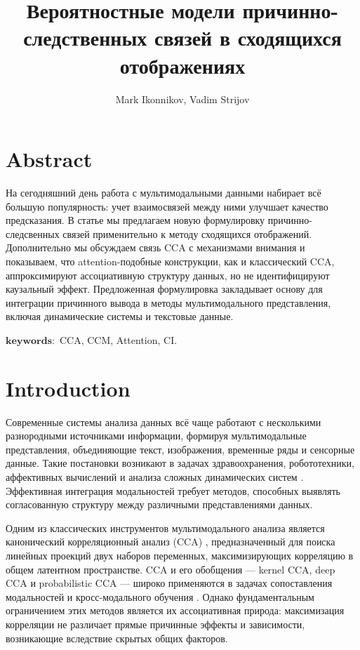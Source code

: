 \documentclass[a4paper,14pt]{article}
\author{Mark Ikonnikov, Vadim Strijov}
\title{\textbf{Вероятностные модели причинно-следственных связей в сходящихся отображениях}}
\theoremstyle{plain} %
\theoremstyle{definition} %
\theoremstyle{remark} %
\begin{document}
	\maketitle
	
	\section{Abstract}
        На сегодняшний день работа с мультимодальными данными набирает всё большую популярность: учет взаимосвязей между ними улучшает качество предсказания. В  статье мы предлагаем новую формулировку причинно-следсвенных связей применительно к методу сходящихся отображений. %
        Дополнительно мы обсуждаем связь CCA с механизмами внимания и показываем, что attention-подобные конструкции, как и классический CCA, аппроксимируют ассоциативную структуру данных, но не идентифицируют каузальный эффект. Предложенная формулировка закладывает основу для интеграции причинного вывода в методы мультимодального представления, включая динамические системы и текстовые данные.

        $\mathbf{keywords:}$ CCA, CCM, Attention, CI.

\section{Introduction}

Современные системы анализа данных всё чаще работают с несколькими разнородными источниками информации, формируя мультимодальные представления, объединяющие текст, изображения, временные ряды и сенсорные данные. Такие постановки возникают в задачах здравоохранения, робототехники, аффективных вычислений и анализа сложных динамических систем \citep{paulpu2020foundation}. Эффективная интеграция модальностей требует методов, способных выявлять согласованную структуру между различными представлениями данных.

Одним из классических инструментов мультимодального анализа является канонический корреляционный анализ (CCA) \citep{yang2021surveycca}, предназначенный для поиска линейных проекций двух наборов переменных, максимизирующих корреляцию в общем латентном пространстве. CCA и его обобщения — kernel CCA, deep CCA и probabilistic CCA — широко применяются в задачах сопоставления модальностей и кросс-модального обучения \citep{chandar2016corrnet, bayoudh2022surveydmlcv}. Однако фундаментальным ограничением этих методов является их ассоциативная природа: максимизация корреляции не различает прямые причинные эффекты и зависимости, возникающие вследствие скрытых общих факторов.
\end{document}
